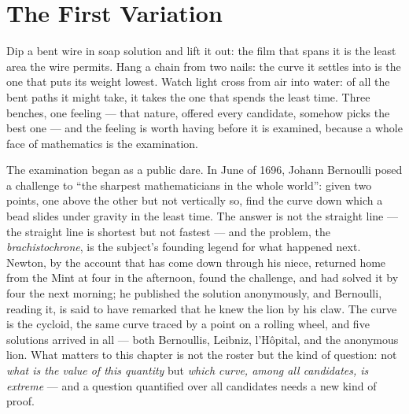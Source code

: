 \chapter{The First Variation}

\begin{intuition}
Dip a bent wire in soap solution and lift it out: the film that spans it
is the least area the wire permits. Hang a chain from two nails: the
curve it settles into is the one that puts its weight lowest. Watch light
cross from air into water: of all the bent paths it might take, it takes
the one that spends the least time. Three benches, one feeling --- that
nature, offered every candidate, somehow picks the best one --- and the
feeling is worth having before it is examined, because a whole face of
mathematics is the examination.
\end{intuition}

The examination began as a public dare. In June of 1696, Johann Bernoulli
posed a challenge to ``the sharpest mathematicians in the whole world'':
given two points, one above the other but not vertically so, find the
curve down which a bead slides under gravity in the least time. The
answer is not the straight line --- the straight line is shortest but not
fastest --- and the problem, the \emph{brachistochrone}, is the subject's
founding legend for what happened next. Newton, by the account that has
come down through his niece, returned home from the Mint at four in the
afternoon, found the challenge, and had solved it by four the next
morning; he published the solution anonymously, and Bernoulli, reading
it, is said to have remarked that he knew the lion by his claw. The
curve is the cycloid, the same curve traced by a point on a rolling
wheel, and five solutions arrived in all --- both Bernoullis, Leibniz,
l'H\^opital, and the anonymous lion. What matters to this chapter is not
the roster but the kind of question: not \emph{what is the value of this
quantity} but \emph{which curve, among all candidates, is extreme} ---
and a question quantified over all candidates needs a new kind of proof.

